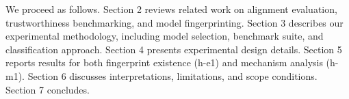 We proceed as follows. Section 2 reviews related work on alignment evaluation,
trustworthiness benchmarking, and model fingerprinting. Section 3 describes our
experimental methodology, including model selection, benchmark suite, and classification
approach. Section 4 presents experimental design details. Section 5 reports results
for both fingerprint existence (h-e1) and mechanism analysis (h-m1). Section 6 discusses
interpretations, limitations, and scope conditions. Section 7 concludes.

